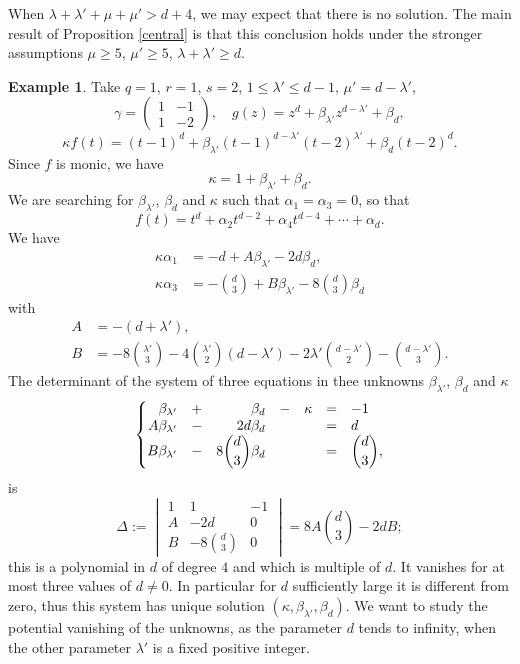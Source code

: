 \documentclass[10pt]{article}
\theoremstyle{definition}
\newtheorem{example}[theorem]{Example}
\numberwithin{equation}{section}
\begin{document}
 When $\lambda +\lambda'+\mu+\mu'>d+4$, we may expect that there is no solution. The main result of Proposition 
\ref{central}
is that this conclusion holds under the stronger assumptions $\mu\geqslant 5$, $\mu'\geqslant 5$, $\lambda +\lambda'\geqslant d$. 

\begin{example}\label{Example} 
Take 
$q=1$, $r=1$, $s=2$, $1\leqslant \lambda'\leqslant d-1$, $\mu'=d-\lambda'$, 
\[
\gamma=\begin{pmatrix} 1&-1\\1&-2\end{pmatrix}, \quad g(z)=z^d+\beta_{\lambda'}z^{d-\lambda'}+\beta_d,
\]
\[
\kappa f(t)= (t-1)^d+\beta_{\lambda'} (t-1)^{d-\lambda'}(t-2)^{\lambda'}+\beta_d(t-2)^d.
\] Since $f$ is monic, we have
\[
\kappa=1+\beta_{\lambda'} +\beta_d.
\]
We are searching for $\beta_{\lambda'}$, $\beta_d$ and $\kappa$ such that $\alpha_1=\alpha_3 =0$, so that 
\[
f(t)=t^d+\alpha_2t^{d-2}+\alpha_4t^{d-4}+\cdots+\alpha_d. 
\]
We have 
\[
\begin{aligned}
\kappa\alpha_1&=-d+A\beta_{\lambda'}-2d\beta_d,
\\
\kappa\alpha_3&=-\binom d 3 +B\beta_{\lambda'}-8 \binom d 3 \beta_d
\end{aligned}
\]
with 
\[
\begin{aligned}
A&= -(d+\lambda'),
\\
B&=
-8\binom {\lambda'} 3 - 4\binom {\lambda'} 2(d-\lambda')-2\lambda' \binom {d-\lambda'} 2- \binom {d-\lambda'} 3.
\end{aligned}
\]
The determinant of the system of three equations in thee unknowns $\beta_{\lambda'}$, $\beta_d$ and $\kappa$
\[
\left\{
\begin{matrix}
\hfill
 \beta_{\lambda'}&+&
\hfill\beta_d&-&\kappa&=&-1\hfill
\\
\hfill
A\beta_{\lambda'} &-&\hfill
2d\beta_d&&&=&d \hfill
\\
\hfill
B\beta_{\lambda'}&-&\hfill
\displaystyle
8 \binom d 3 \beta_d&&&=&
\displaystyle \binom d 3,\hfill
\end{matrix}
\right.
\]
is 
\[
\Delta := \begin{vmatrix} 
1& 1& -1\\
A& -2d& 0\\
B& -8 \binom d3 & 0
\end{vmatrix}
=8A\binom d3 -2d B; 
\]
this is a polynomial in $d$ of degree $4$ and which is multiple of $d$. It vanishes for at most three values of $d\not=0$.
In particular for $d$ sufficiently large it
is different from zero, thus this system has unique solution $(\kappa,\beta_{\lambda'},\beta_d)$. We want to study the potential vanishing of the unknowns, as the parameter $d$ tends to infinity, when the other parameter $\lambda'$ is a fixed positive integer. 

\end{example}
\end{document}
